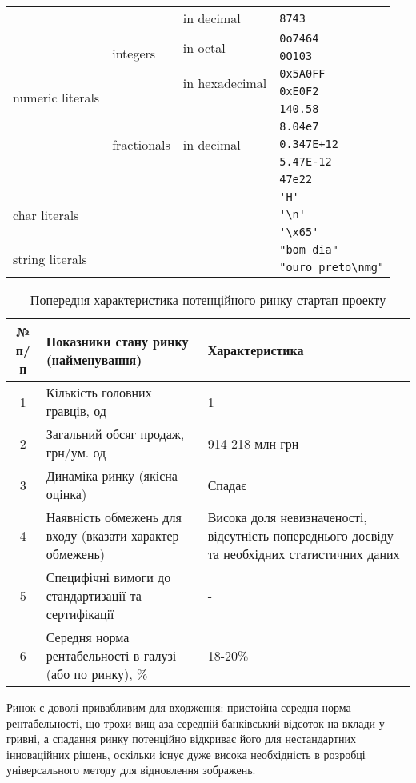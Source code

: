 \begin{tabular}{|l|l|l|l|}
	\hline
  \multirow{10}{*}{numeric literals} & \multirow{5}{*}{integers} & in decimal & \verb|8743| \\ \cline{3-4}
  & & \multirow{2}{*}{in octal} & \verb|0o7464| \\ \cline{4-4}
  & & & \verb|0O103| \\ \cline{3-4}
  & & \multirow{2}{*}{in hexadecimal} & \verb|0x5A0FF| \\ \cline{4-4}
  & & & \verb|0xE0F2| \\ \cline{2-4}
  & \multirow{5}{*}{fractionals} & \multirow{5}{*}{in decimal} & \verb|140.58| \\ \cline{4-4}
  & & & \verb|8.04e7| \\ \cline{4-4}
  & & & \verb|0.347E+12| \\ \cline{4-4}
  & & & \verb|5.47E-12| \\ \cline{4-4}
  & & & \verb|47e22| \\ \cline{1-4}
  \multicolumn{3}{|l|}{\multirow{3}{*}{char literals}} & \verb|'H'| \\ \cline{4-4}
  \multicolumn{3}{|l|}{} & \verb|'\n'| \\ \cline{4-4}          %
  \multicolumn{3}{|l|}{} & \verb|'\x65'| \\ \cline{1-4}        %
  \multicolumn{3}{|l|}{\multirow{2}{*}{string literals}} & \verb|"bom dia"| \\ \cline{4-4}
  \multicolumn{3}{|l|}{} & \verb|"ouro preto\nmg"| \\ \cline{1-4}          %
\end{tabular}

\begin{table}
	\begin{tabularx}{\textwidth}{|c|X|X|}
    \hline
    № п/п & Показники стану ринку (найменування) & Характеристика \\ \hline
    1 & Кількість головних гравців, од & 1 \\ \hline
    2 & Загальний обсяг продаж, грн/ум. од & 914 218 млн грн \\ \hline
    3 & Динаміка ринку (якісна оцінка) & Спадає \\ \hline
    4 & Наявність обмежень для входу (вказати характер обмежень) & Висока доля невизначеності, відсутність попереднього досвіду та необхідних статистичних даних \\ \hline
    5 & Специфічні вимоги до стандартизації та сертифікації & - \\ \hline
    6 & Середня норма рентабельності в галузі (або по ринку), \% & 18-20\% \\
    \hline
    \end{tabularx}
\caption{Попередня характеристика потенційного ринку стартап-проекту} \label{tab:sometab}
\end{table}
Ринок є доволі привабливим для входження: пристойна середня норма рентабельності, що трохи вищ аза середній банківський відсоток на вклади у гривні, а спадання ринку потенційно відкриває його для нестандартних інноваційних рішень, оскільки існує дуже висока необхідність в розробці універсального методу для відновлення зображень.

